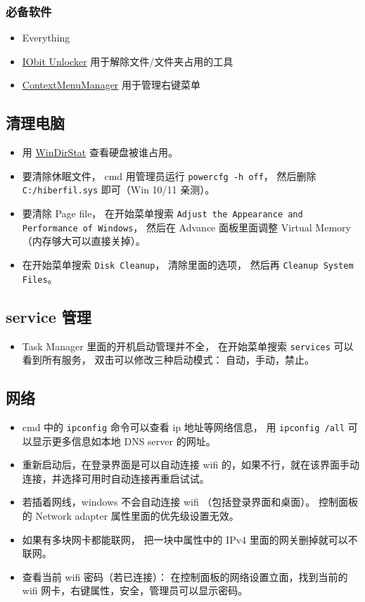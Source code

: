 \subsubsection{必备软件}
\begin{itemize}
\item Everything
\item \href{https://www.iobit.com/en/iobit-unlocker.php}{IObit Unlocker} 用于解除文件/文件夹占用的工具
\item \href{https://github.com/BluePointLilac/ContextMenuManager}{ContextMenuManager} 用于管理右键菜单
\end{itemize}

\subsection{清理电脑}
\begin{itemize}
\item 用 \href{https://windirstat.net/}{WinDirStat} 查看硬盘被谁占用。
\item 要清除休眠文件， cmd 用管理员运行 \verb|powercfg -h off|， 然后删除 \verb|C:/hiberfil.sys| 即可（Win 10/11 亲测）。
\item 要清除 Page file， 在开始菜单搜索 \verb|Adjust the Appearance and Performance of Windows|， 然后在 Advance 面板里面调整 Virtual Memory（内存够大可以直接关掉）。
\item 在开始菜单搜索 \verb|Disk Cleanup|， 清除里面的选项， 然后再 \verb|Cleanup System Files|。
\end{itemize}

\subsection{service 管理}
\begin{itemize}
\item Task Manager 里面的开机启动管理并不全， 在开始菜单搜索 \verb`services` 可以看到所有服务， 双击可以修改三种启动模式： 自动，手动，禁止。
\end{itemize}

\subsection{网络}
\begin{itemize}
\item cmd 中的 \verb|ipconfig| 命令可以查看 ip 地址等网络信息， 用 \verb`ipconfig /all` 可以显示更多信息如本地 DNS server 的网址。
\item 重新启动后，在登录界面是可以自动连接 wifi 的，如果不行，就在该界面手动连接，并选择可用时自动连接再重启试试。
\item 若插着网线，windows 不会自动连接 wifi （包括登录界面和桌面）。 控制面板的 Network adapter 属性里面的优先级设置无效。
\item 如果有多块网卡都能联网， 把一块中属性中的 IPv4 里面的网关删掉就可以不联网。
\item 查看当前 wifi 密码（若已连接）： 在控制面板的网络设置立面，找到当前的 wifi 网卡，右键属性，安全，管理员可以显示密码。
\end{itemize}

